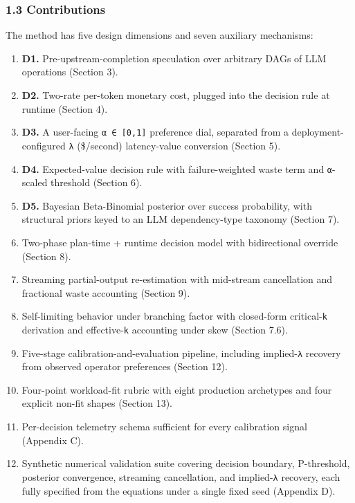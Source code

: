 \documentclass[
  11pt,
]{article}
\providecommand{\tightlist}{%
  \setlength{\itemsep}{0pt}\setlength{\parskip}{0pt}}
\begin{document}
\subsubsection{1.3 Contributions}\label{contributions}

The method has five design dimensions and seven auxiliary mechanisms:

\begin{enumerate}
\def\labelenumi{\arabic{enumi}.}
\tightlist
\item
  \textbf{D1.} Pre-upstream-completion speculation over arbitrary DAGs
  of LLM operations (Section 3).
\item
  \textbf{D2.} Two-rate per-token monetary cost, plugged into the
  decision rule at runtime (Section 4).
\item
  \textbf{D3.} A user-facing \texttt{α\ ∈\ {[}0,1{]}} preference dial,
  separated from a deployment-configured \texttt{λ} (\$/second)
  latency-value conversion (Section 5).
\item
  \textbf{D4.} Expected-value decision rule with failure-weighted waste
  term and \texttt{α}-scaled threshold (Section 6).
\item
  \textbf{D5.} Bayesian Beta-Binomial posterior over success
  probability, with structural priors keyed to an LLM dependency-type
  taxonomy (Section 7).
\item
  Two-phase plan-time + runtime decision model with bidirectional
  override (Section 8).
\item
  Streaming partial-output re-estimation with mid-stream cancellation
  and fractional waste accounting (Section 9).
\item
  Self-limiting behavior under branching factor with closed-form
  critical-\texttt{k} derivation and effective-\texttt{k} accounting
  under skew (Section 7.6).
\item
  Five-stage calibration-and-evaluation pipeline, including
  implied-\texttt{λ} recovery from observed operator preferences
  (Section 12).
\item
  Four-point workload-fit rubric with eight production archetypes and
  four explicit non-fit shapes (Section 13).
\item
  Per-decision telemetry schema sufficient for every calibration signal
  (Appendix C).
\item
  Synthetic numerical validation suite covering decision boundary,
  P-threshold, posterior convergence, streaming cancellation, and
  implied-\texttt{λ} recovery, each fully specified from the equations
  under a single fixed seed (Appendix D).
\end{enumerate}
\end{document}
